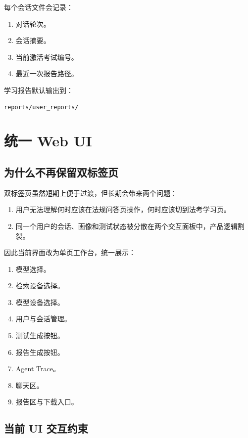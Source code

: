 \documentclass[12pt]{ctexart}
\begin{document}
每个会话文件会记录：

\begin{enumerate}
  \item 对话轮次。
  \item 会话摘要。
  \item 当前激活考试编号。
  \item 最近一次报告路径。
\end{enumerate}

学习报告默认输出到：

\begin{lstlisting}[language=bash]
reports/user_reports/
\end{lstlisting}

\section{统一 Web UI}

\subsection{为什么不再保留双标签页}

双标签页虽然短期上便于过渡，但长期会带来两个问题：

\begin{enumerate}
  \item 用户无法理解何时应该在法规问答页操作，何时应该切到法考学习页。
  \item 同一个用户的会话、画像和测试状态被分散在两个交互面板中，产品逻辑割裂。
\end{enumerate}

因此当前界面改为单页工作台，统一展示：

\begin{enumerate}
  \item 模型选择。
  \item 检索设备选择。
  \item 模型设备选择。
  \item 用户与会话管理。
  \item 测试生成按钮。
  \item 报告生成按钮。
  \item Agent Trace。
  \item 聊天区。
  \item 报告区与下载入口。
\end{enumerate}

\subsection{当前 UI 交互约束}
\end{document}
